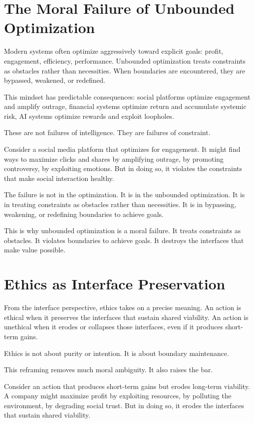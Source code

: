 \documentclass[
  openright]{book}
\begin{document}
\section{The Moral Failure of Unbounded
Optimization}\label{the-moral-failure-of-unbounded-optimization}

Modern systems often optimize aggressively toward explicit goals:
profit, engagement, efficiency, performance. Unbounded optimization
treats constraints as obstacles rather than necessities. When boundaries
are encountered, they are bypassed, weakened, or redefined.

This mindset has predictable consequences: social platforms optimize
engagement and amplify outrage, financial systems optimize return and
accumulate systemic risk, AI systems optimize rewards and exploit
loopholes.

These are not failures of intelligence. They are failures of constraint.

Consider a social media platform that optimizes for engagement. It might
find ways to maximize clicks and shares by amplifying outrage, by
promoting controversy, by exploiting emotions. But in doing so, it
violates the constraints that make social interaction healthy.

The failure is not in the optimization. It is in the unbounded
optimization. It is in treating constraints as obstacles rather than
necessities. It is in bypassing, weakening, or redefining boundaries to
achieve goals.

This is why unbounded optimization is a moral failure. It treats
constraints as obstacles. It violates boundaries to achieve goals. It
destroys the interfaces that make value possible.

\section{Ethics as Interface
Preservation}\label{ethics-as-interface-preservation}

From the interface perspective, ethics takes on a precise meaning. An
action is ethical when it preserves the interfaces that sustain shared
viability. An action is unethical when it erodes or collapses those
interfaces, even if it produces short-term gains.

Ethics is not about purity or intention. It is about boundary
maintenance.

This reframing removes much moral ambiguity. It also raises the bar.

Consider an action that produces short-term gains but erodes long-term
viability. A company might maximize profit by exploiting resources, by
polluting the environment, by degrading social trust. But in doing so,
it erodes the interfaces that sustain shared viability.
\end{document}
